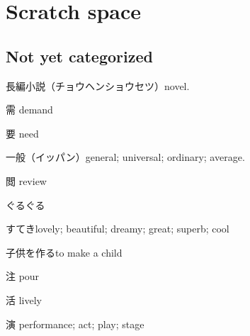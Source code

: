\chapter{Scratch space}

\section{Not yet categorized}

長編小説（チョウヘンショウセツ）novel.

需 demand

要 need

一般（イッパン）general; universal; ordinary; average.

閲 review

ぐるぐる

すてきlovely; beautiful; dreamy; great; superb; cool


子供を作るto make a child

注 pour

活 lively

演 performance; act; play; stage
